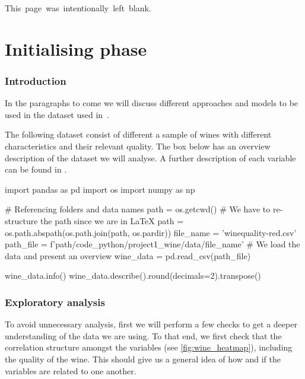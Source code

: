\documentclass[11pt]{article}
\newcommand\myemptypage{
    \null
    \thispagestyle{empty}
    \mbox{This page was intentionally left blank.}
    \addtocounter{page}{-1}
    \newpage
    }
\begin{document}


\myemptypage

\tableofcontents\newpage

\part{Initialising phase} \label{part:initialising}

\section{Introduction}\label{sec:introduction}
In the paragraphs to come we will discuss different approaches and models to be used in the dataset used in~\cite{wine}.

The following dataset consist of different a sample of wines with different characteristics and their relevant
quality.
The box below has an overview description of the dataset we will analyse.
A further description of each variable can be found in .

\begin{pyconcode}
import pandas as pd
import os
import numpy as np

# Referencing folders and data names
path = os.getcwd()
# We have to re-structure the path since we are in LaTeX
path = os.path.abspath(os.path.join(path, os.pardir))
file_name = 'winequality-red.csv'
path_file = f'{path}/code_python/project1_wine/data/{file_name}'
# We load the data and present an overview
wine_data = pd.read_csv(path_file)
\end{pyconcode}

\begin{pyconsole}[][]
wine_data.info()
wine_data.describe().round(decimals=2).transpose()
\end{pyconsole}

\section{Exploratory analysis}\label{sec:exploratory-analysis}

To avoid unnecessary analysis, first we will perform a few checks to get a deeper understanding of the
data we are using.
To that end, we first check that the correlation structure amongst the variables (see \cref{fig:wine_heatmap}),
including the quality of the wine.
This should give us a general idea of how and if the variables are related to one another.
\end{document}

